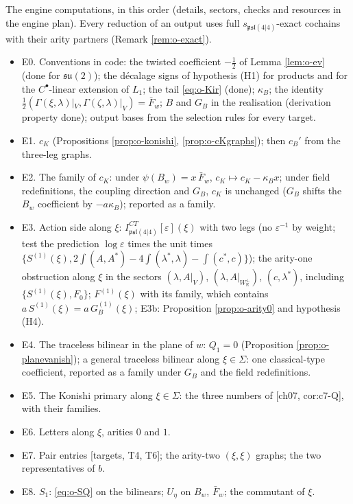 The engine computations, in this order (details, sectors, checks and resources in the engine plan). Every reduction of an output uses full $s_{\mathfrak{psl}(4|4)}$-exact cochains with their arity partners (Remark \ref{rem:o-exact}).
\begin{itemize}
\item E0. Conventions in code: the twisted coefficient $-\tfrac12$ of Lemma \ref{lem:o-ev} (done for $\mathfrak{su}(2)$); the décalage signs of hypothesis (H1) for products and for the $C^\bullet$-linear extension of $L_1$; the tail \eqref{eq:o-Kir} (done); $\kappa_B$; the identity $\tfrac12(\Gamma(\xi,\lambda)|_V,\Gamma(\zeta,\lambda)|_V)=\bar F_w$; $B$ and $G_B$ in the realisation (derivation property done); output bases from the selection rules for every target.
\item E1. $c_K$ (Propositions \ref{prop:o-konishi}, \ref{prop:o-cKgraphs}); then $c_B'$ from the three-leg graphs.
\item E2. The family of $c_K$: under $\psi(B_w)=x\,\bar F_w$, $c_K\mapsto c_K-\kappa_Bx$; under field redefinitions, the coupling direction and $G_B$, $c_K$ is unchanged ($G_B$ shifts the $B_w$ coefficient by $-a\kappa_B$); reported as a family.
\item E3. Action side along $\xi$: $I^{CT}_{\mathfrak{psl}(4|4)}[\varepsilon](\xi)$ with two legs (no $\varepsilon^{-1}$ by weight; test the prediction $\log\varepsilon$ times the unit times $\{S^{(1)}(\xi),2\int(A,A^*)-4\int(\lambda^*,\lambda)-\int(c^*,c)\}$); the arity-one obstruction along $\xi$ in the sectors $(\lambda,A|_V)$, $(\lambda,A|_{W_{\mathbb R}^\perp})$, $(c,\lambda^*)$, including $\{S^{(1)}(\xi),F_0\}$; $F^{(1)}(\xi)$ with its family, which contains $a\,S^{(1)}(\xi)=a\,G_B^{(1)}(\xi)$; E3b: Proposition \ref{prop:o-arity0} and hypothesis (H4).
\item E4. The traceless bilinear in the plane of $w$: $Q_1=0$ (Proposition \ref{prop:o-planevanish}); a general traceless bilinear along $\xi\in\Sigma$: one classical-type coefficient, reported as a family under $G_B$ and the field redefinitions.
\item E5. The Konishi primary along $\xi\in\Sigma$: the three numbers of [ch07, cor:c7-Q], with their families.
\item E6. Letters along $\xi$, arities $0$ and $1$.
\item E7. Pair entries [targets, T4, T6]; the arity-two $(\xi,\xi)$ graphs; the two representatives of $b$.
\item E8. $S_1$: \eqref{eq:o-SQ} on the bilinears; $U_\eta$ on $B_w$, $\bar F_w$; the commutant of $\xi$.

\end{itemize}
